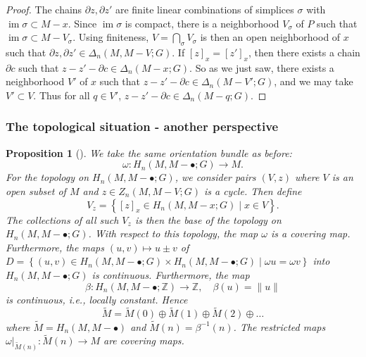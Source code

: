 \documentclass[reqno]{amsart}
\newtheorem{proposition}[theorem]{Proposition}
\theoremstyle{definition}
\theoremstyle{remark}
\DeclareMathOperator{\im}{im}
\begin{document}
\begin{proof}
    The chains $\partial z, \partial z'$ are finite linear
    combinations of simplices $\sigma$ with
    $\im \sigma \subset M - x$. Since 
    $\im \sigma$ is compact, there
    is a neighborhood $V_{\sigma}$ of $P$ such that
    $\im \sigma \subset M - V_{\sigma}$. Using finiteness, 
    $V = \bigcap_{\sigma} V_{\sigma}$ is then an open
    neighborhood of $x$ such that
    $\partial z, \partial z' \in \Delta_n \left( M, M-V;G \right) $.
    If $\left[ z \right]_x = \left[ z' \right]_x$, then
    there exists a chain $\partial c$ such that
    $z -z' - \partial c \in 
    \Delta_n \left( M - x;G \right) $.
    So as we just saw, there
    exists a neighborhood $V'$ of $x$ such that
    $z-z'- \partial c \in \Delta_n \left( M-V';G \right) $, and we
    may take $V' \subset V$.
    Thus for all $q \in V'$,
    $z-z'- \partial c \in \Delta_n (M-q;G)$.
\end{proof}

\subsubsection{The topological situation - another perspective}

\begin{proposition}[]
    We take the same
    orientation bundle as before:
    \[
    \omega \colon H_n (M, M - \bullet;G) \to 
    M.
    \] 
    For the topology on $H_n (M, M - \bullet;G)$, we
    consider pairs
    $(V,z)$ where $V$ is an open subset of $M$ and
    $z \in Z_n (M, M-V;G)$ is a cycle.
    Then define
    \[
    V_z = \left\{ \left[ z \right]_x \in 
    H_n (M, M -x;G)  \mid x \in V \right\} .
    \] 
    The collections of all such 
    $V_z$ is then the base of the topology on
    $H_n (M, M - \bullet;G)$.
    With respect to this topology, the map
    $\omega$ is a covering map.
    Furthermore, the maps
    $(u,v) \mapsto u \pm v$ of
    $D = \left\{ (u,v) \in 
    H_n (M, M- \bullet;G) \times H_n (M, M- \bullet;G)
 \mid \omega u = \omega v \right\} $ into
 $H_n (M, M- \bullet;G)$ is continuous.
 Furthermore, the map
 \[
 \beta \colon H_n (M, M- \bullet; \mathbb{Z}) \to \mathbb{Z},
 \quad
 \beta(u) = \|u\| 
 \] 
 is continuous, i.e., locally constant. Hence
 \[
 \tilde{M} = \tilde{M}(0) \oplus \tilde{M}(1) \oplus
 \tilde{M}(2) \oplus \ldots
 \] 
 where
 $\tilde{M} = H_n (M, M - \bullet)$ and
 $\tilde{M}(n) = 
 \beta^{-1}(n)$.
 The restricted maps
 $\omega|_{\tilde{M}(n)} \colon \tilde{M}(n) \to M$ are
 covering maps.
\end{proposition}
\end{document}

